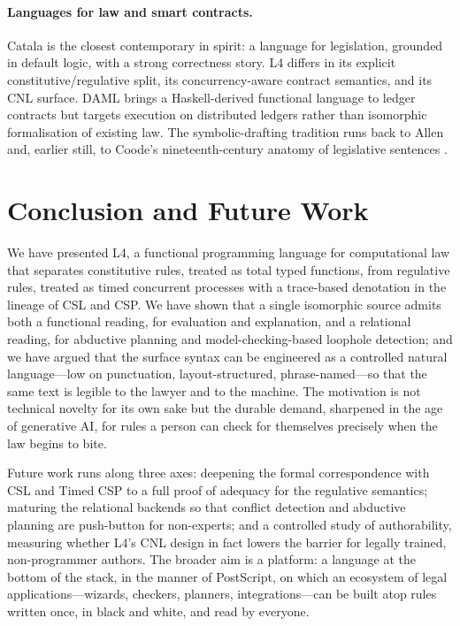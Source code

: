 \documentclass[sigconf,nonacm]{acmart}
\begin{document}
\paragraph{Languages for law and smart contracts.}
Catala \cite{merigoux2021catala} is the closest contemporary in spirit: a
language for legislation, grounded in default logic, with a strong
correctness story. L4 differs in its explicit constitutive/regulative split,
its concurrency-aware contract semantics, and its CNL surface. DAML
\cite{daml} brings a Haskell-derived functional language to ledger
contracts but targets execution on distributed ledgers rather than
isomorphic formalisation of existing law. The symbolic-drafting tradition
runs back to Allen \cite{allen1957symbolic} and, earlier still, to Coode's
nineteenth-century anatomy of legislative sentences \cite{coode1843}.

\section{Conclusion and Future Work}\label{sec:conclusion}
We have presented L4, a functional programming language for computational
law that separates constitutive rules, treated as total typed functions,
from regulative rules, treated as timed concurrent processes with a
trace-based denotation in the lineage of CSL and CSP. We have shown that a
single isomorphic source admits both a functional reading, for evaluation
and explanation, and a relational reading, for abductive planning and
model-checking-based loophole detection; and we have argued that the
surface syntax can be engineered as a controlled natural language---low on
punctuation, layout-structured, phrase-named---so that the same text is
legible to the lawyer and to the machine. The motivation is not technical
novelty for its own sake but the durable demand, sharpened in the age of
generative AI, for rules a person can check for themselves precisely when
the law begins to bite.

Future work runs along three axes: deepening the formal correspondence with
CSL and Timed CSP to a full proof of adequacy for the regulative semantics;
maturing the relational backends so that conflict detection and abductive
planning are push-button for non-experts; and a controlled study of
authorability, measuring whether L4's CNL design in fact lowers the barrier
for legally trained, non-programmer authors. The broader aim is a platform:
a language at the bottom of the stack, in the manner of PostScript, on which
an ecosystem of legal applications---wizards, checkers, planners,
integrations---can be built atop rules written once, in black and white,
and read by everyone.
\end{document}
